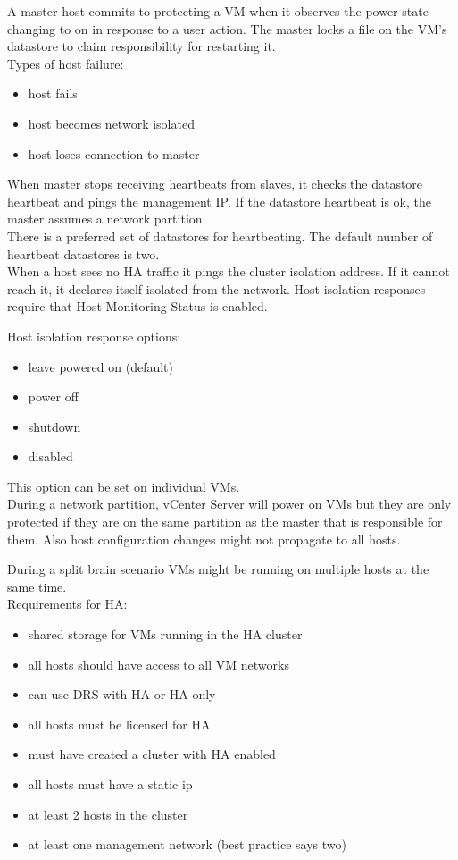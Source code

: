 A master host commits to protecting a VM when it observes the power state
changing to on in response to a user action. The master locks a file on the
VM's datastore to claim responsibility for restarting it.\\

Types of host failure:

\begin{itemize}
\item host fails
\item host becomes network isolated
\item host loses connection to master
\end{itemize}

When master stops receiving heartbeats from slaves, it checks the datastore
heartbeat and pings the management IP. If the datastore heartbeat is ok, the
master assumes a network partition.\\

There is a preferred set of datastores for heartbeating. The default number
of heartbeat datastores is two.\\

When a host sees no HA traffic it pings the cluster isolation address. If it
cannot reach it, it declares itself isolated from the network. Host isolation
responses require that Host Monitoring Status is enabled.

Host isolation response options:

\begin{itemize}
\item leave powered on (default)
\item power off
\item shutdown
\item disabled
\end{itemize}

This option can be set on individual VMs.\\

During a network partition, vCenter Server will power on VMs but they are
only protected if they are on the same partition as the master that is
responsible for them. Also host configuration changes might not propagate to
all hosts.

During a split brain scenario VMs might be running on multiple hosts at the
same time.\\

Requirements for HA:

\begin{itemize}
\item shared storage for VMs running in the HA cluster
\item all hosts should have access to all VM networks
\item can use DRS with HA or HA only
\item all hosts must be licensed for HA
\item must have created a cluster with HA enabled
\item all hosts must have a static ip
\item at least 2 hosts in the cluster
\item at least one management network (best practice says two)
\end{itemize}

